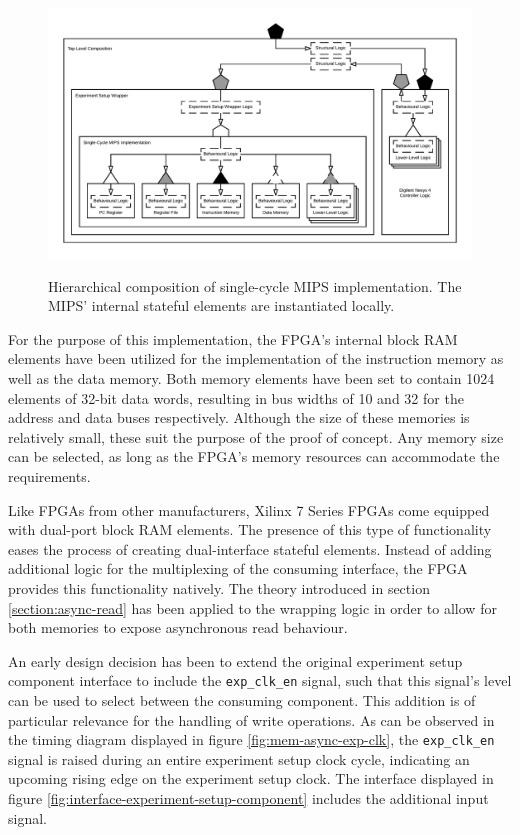 \documentclass{article}
\begin{document}
\begin{figure}
    \centering
    \caption{Hierarchical composition of single-cycle MIPS implementation. The MIPS' internal stateful elements are instantiated locally.}
    \includegraphics[width=\textwidth,trim=70px 70px 70px 70px, clip=true]{img/mips-original}
    \label{fig:mips-original}
\end{figure}

For the purpose of this implementation, the FPGA's internal block RAM elements have been utilized for the implementation of the instruction memory as well as the data memory. Both memory elements have been set to contain 1024 elements of 32-bit data words, resulting in bus widths of 10 and 32 for the address and data buses respectively. Although the size of these memories is relatively small, these suit the purpose of the proof of concept. Any memory size can be selected, as long as the FPGA's memory resources can accommodate the requirements. 

Like FPGAs from other manufacturers, Xilinx 7 Series FPGAs come equipped with dual-port block RAM elements. The presence of this type of functionality eases the process of creating dual-interface stateful elements. Instead of adding additional logic for the multiplexing of the consuming interface, the FPGA provides this functionality natively. The theory introduced in section \ref{section:async-read} has been applied to the wrapping logic in order to allow for both memories to expose asynchronous read behaviour.

An early design decision has been to extend the original experiment setup component interface to include the \texttt{exp\_clk\_en} signal, such that this signal's level can be used to select between the consuming component. This addition is of particular relevance for the handling of write operations. As can be observed in the timing diagram displayed in figure \ref{fig:mem-async-exp-clk}, the \texttt{exp\_clk\_en} signal is raised during an entire experiment setup clock cycle, indicating an upcoming rising edge on the experiment setup clock. The interface displayed in figure \ref{fig:interface-experiment-setup-component} includes the additional input signal.
\end{document}
